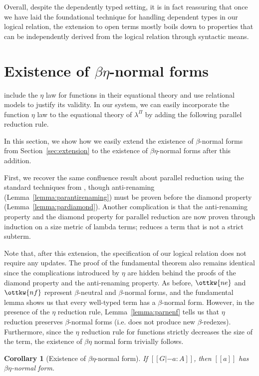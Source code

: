 \documentclass[\ifpublic nolinenum\else\fi,online,OA]{jfp}
\newcommand{\lang}{$\lambda^{\Pi}$\xspace}
\newtheorem{corollary}[theorem]{Corollary}
\theoremstyle{definition}
\begin{document}
Overall, despite the dependently typed setting, it is in fact reassuring that
once we have laid the foundational technique for handling dependent types in
our logical relation, the extension to open terms mostly boils down to
properties that can be independently derived from the logical relation through
syntactic means.

\section{Existence of \texorpdfstring{$\beta\eta$-}{beta-eta--}normal forms}
\label{sec:betaeta}
\citet{nbeincoq,decagda,martin-lof-a-la-coq}
include the $\eta$ law for functions in their equational theory and
use relational models to justify its validity.
In our system, we can easily incorporate the function $\eta$ law to the equational
theory of \lang{} by adding the following parallel reduction rule.
\begin{center}
\end{center}
In this section, we show how we easily extend the existence of $\beta$-normal
forms from Section~\ref{sec:extension} to the existence of
$\beta\eta$-normal forms after this addition. 

First, we recover the same confluence result about parallel reduction using the
standard techniques from \citet{barendregt:lambda-calculi-with-types,
  takahashi-parallel-reduction}, though anti-renaming
(Lemma~\ref{lemma:parantirenaming}) must be proven before the diamond property
(Lemma~\ref{lemma:pardiamond}). Another complication is that
the anti-renaming property and the diamond property for parallel reduction are now proven through
induction on a size metric of lambda terms;  reduces a term
that is not a strict subterm.

Note that, after this extension, the specification of our logical
relation does not require
any updates. The proof of the fundamental theorem also remains
identical since the complications introduced by $\eta$ are hidden
behind the proofs of the diamond property and the anti-renaming property.
As before, $\ottkw{ne}$ and $\ottkw{nf}$
represent $\beta$-neutral and $\beta$-normal forms, and the
fundamental lemma shows us that every well-typed term has a
$\beta$-normal form. However, in the presence of the $\eta$ reduction
rule, Lemma~\ref{lemma:parnenf} tells us that $\eta$ reduction
preserves $\beta$-normal forms (i.e. does not produce new
$\beta$-redexes). Furthermore, since the $\eta$ reduction rule for
functions strictly decreases the size of the term, the existence of
$\beta\eta$ normal form trivially follows.
\begin{corollary}[Existence of $\beta\eta$-normal form]
\label{corollary:exbetaeta}
If $[[G |- a : A]]$, then $[[a]]$ has $\beta\eta$-normal form.
\end{corollary}
\end{document}
